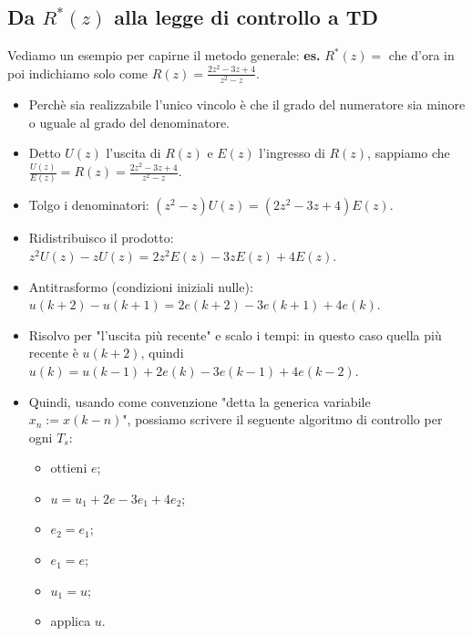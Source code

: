 \begin{landscape}
\begin{multicols*}{2}
    \subsection{Da $R^*(z)$ alla legge di controllo a TD}
    Vediamo un esempio per capirne il metodo generale:\newline
    \textbf{es.} $R^*(z) = $ che d'ora in poi indichiamo solo come $R(z) = \frac{2z^2 - 3z +4}{z^2 -z}$. 
    \begin{itemize}
        \item Perchè sia realizzabile l'unico vincolo è che il grado del numeratore sia minore o uguale al grado del denominatore.
        \item  Detto $U(z)$ l'uscita di $R(z)$ e $E(z)$ l'ingresso di $R(z)$, sappiamo che $\frac{U(z)}{E(z)} = R(z) = \frac{2z^2 - 3z +4}{z^2 -z}$.
        \item Tolgo i denominatori: $(z^2-z) U(z) = (2z^2 -3z+4) E(z)$.
        \item Ridistribuisco il prodotto: $z^2 U(z) - z U(z) = 2z^2 E(z) - 3zE(z) + 4 E(z)$.
        \item Antitrasformo (condizioni iniziali nulle): $u(k+2) - u(k+1) = 2e(k+2) -3e(k+1) + 4e(k)$.
        \item Risolvo per "l'uscita più recente" e scalo i tempi: in questo caso quella più recente è $u(k+2)$, quindi $u(k) = u(k-1) + 2 e(k) -3e(k-1) + 4e(k-2)$.
        \item Quindi, usando come convenzione "detta la generica variabile $x_n := x(k-n)$", possiamo scrivere il seguente algoritmo di controllo per ogni $T_s$:
        \begin{itemize}
            \item ottieni $e$;
            \item $u = u_1 +  2e - 3e_1 + 4e_2$;
            \item $e_2 = e_1$;
            \item $e_1 = e$;
            \item $u_1 = u$;
            \item applica $u$.
        \end{itemize}
    \end{itemize}

\end{multicols*}
\end{landscape}

